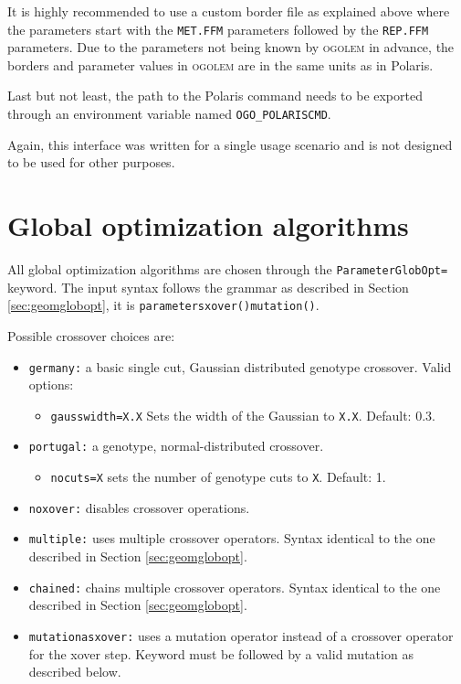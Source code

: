 \documentclass[a4paper,10pt]{scrbook}
\newcommand{\ogo}{\textsc{ogolem}}
\begin{document}
It is highly recommended to use a custom border file as explained above where
the parameters start with the \texttt{MET.FFM} parameters followed by the
\texttt{REP.FFM} parameters. Due to the parameters not being known by \ogo{} in
advance, the borders and parameter values in \ogo{} are in the same units as in
Polaris.

Last but not least, the path to the Polaris command needs to be exported
through an environment variable named \texttt{OGO\_POLARISCMD}.

Again, this interface was written for a single usage scenario and is not
designed to be used for other purposes.

\section{Global optimization algorithms}
All global optimization algorithms are chosen through the
\texttt{ParameterGlobOpt=} keyword. The input syntax follows the grammar as 
described in Section \ref{sec:geomglobopt}, it is 
\texttt{parameters{xover()mutation()}}.

Possible crossover choices are:
\begin{itemize}
  \item \texttt{germany:} a basic single cut, Gaussian distributed genotype 
crossover. Valid options:
  \begin{itemize}
    \item \texttt{gausswidth=X.X} Sets the width of the Gaussian to 
\texttt{X.X}. Default: 0.3.
  \end{itemize}
  \item \texttt{portugal:} a genotype, normal-distributed crossover. 
  \begin{itemize}
    \item \texttt{nocuts=X} sets the number of genotype cuts to \texttt{X}. 
Default: 1.
  \end{itemize}
  \item \texttt{noxover:} disables crossover operations.
  \item \texttt{multiple:} uses multiple crossover operators. Syntax identical 
to the one described in Section \ref{sec:geomglobopt}.
  \item \texttt{chained:} chains multiple crossover operators. Syntax identical 
to the one described in Section \ref{sec:geomglobopt}.
  \item \texttt{mutationasxover:} uses a mutation operator instead of a 
crossover operator for the xover step. Keyword must be followed by a valid 
mutation as described below.
\end{itemize}
\end{document}

